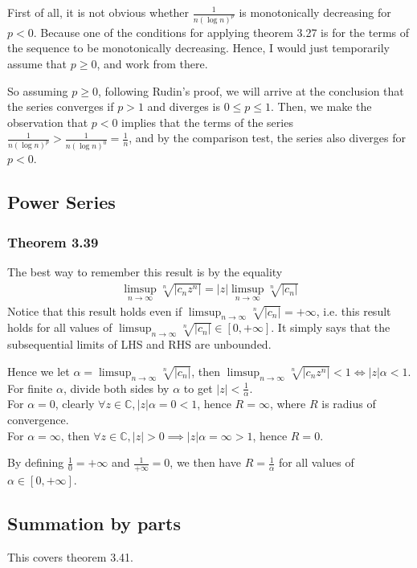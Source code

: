 \documentclass{article}
\begin{document}
First of all, it is not obvious whether $\frac{1}{n(\log n)^p}$ is monotonically decreasing for $p<0$. Because one of the conditions for applying theorem 3.27 is for the terms of the sequence to be monotonically decreasing. Hence, I would just temporarily assume that $p\geq 0$, and work from there.

So assuming $p\geq 0$, following Rudin's proof, we will arrive at the conclusion that the series converges if $p > 1$ and diverges is $0\leq p \leq 1$. Then, we make the observation that $p < 0$ implies that the terms of the series $\frac{1}{n(\log n)^p} > \frac{1}{n(\log n)^0}=\frac{1}{n}$, and by the comparison test, the series also diverges for $p < 0$.


\subsection{Power Series}
\subsubsection{Theorem 3.39}
The best way to remember this result is by the equality 
\begin{align*}
	\limsup_{n\rightarrow \infty}\sqrt[n]{|c_nz^n|}=|z|\limsup_{n\rightarrow \infty}\sqrt[n]{|c_n|}
\end{align*}
Notice that this result holds even if $\limsup_{n\rightarrow \infty}\sqrt[n]{|c_n|}=+\infty$, i.e. this result holds for all values of $\limsup_{n\rightarrow \infty}\sqrt[n]{|c_n|}\in [0, +\infty]$. It simply says that the subsequential limits of LHS and RHS are unbounded.

Hence we let $\alpha=\limsup_{n\rightarrow \infty}\sqrt[n]{|c_n|}$, then $\limsup_{n\rightarrow \infty}\sqrt[n]{|c_nz^n|}<1 \iff |z|\alpha<1$.\\
For finite $\alpha$, divide both sides by $\alpha$ to get $|z|<\frac{1}{\alpha}$.\\
For $\alpha=0$, clearly $\forall z\in \mathbb{C}, |z|\alpha=0<1$, hence $R=\infty$, where $R$ is radius of convergence.\\
For $\alpha=\infty$, then $\forall z\in \mathbb{C}, |z|>0 \implies |z|\alpha=\infty > 1$, hence $R=0$.

By defining $\frac{1}{0}=+\infty$ and $\frac{1}{+\infty}=0$, we then have $R=\frac{1}{\alpha}$ for all values of $\alpha \in [0, +\infty]$.

\subsection{Summation by parts}
This covers theorem 3.41.
\end{document}
